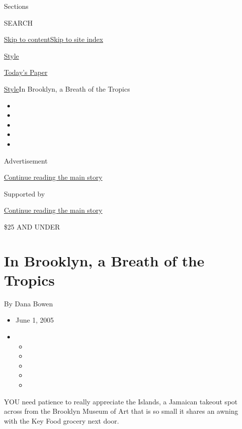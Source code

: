 Sections

SEARCH

\protect\hyperlink{site-content}{Skip to
content}\protect\hyperlink{site-index}{Skip to site index}

\href{https://www.nytimes3xbfgragh.onion/section/style}{Style}

\href{https://myaccount.nytimes3xbfgragh.onion/auth/login?response_type=cookie\&client_id=vi}{}

\href{https://www.nytimes3xbfgragh.onion/section/todayspaper}{Today's
Paper}

\href{/section/style}{Style}\textbar{}In Brooklyn, a Breath of the
Tropics

\begin{itemize}
\item
\item
\item
\item
\item
\end{itemize}

Advertisement

\protect\hyperlink{after-top}{Continue reading the main story}

Supported by

\protect\hyperlink{after-sponsor}{Continue reading the main story}

\$25 AND UNDER

\hypertarget{in-brooklyn-a-breath-of-the-tropics}{%
\section{In Brooklyn, a Breath of the
Tropics}\label{in-brooklyn-a-breath-of-the-tropics}}

By Dana Bowen

\begin{itemize}
\item
  June 1, 2005
\item
  \begin{itemize}
  \item
  \item
  \item
  \item
  \item
  \end{itemize}
\end{itemize}

YOU need patience to really appreciate the Islands, a Jamaican takeout
spot across from the Brooklyn Museum of Art that is so small it shares
an awning with the Key Food grocery next door.

